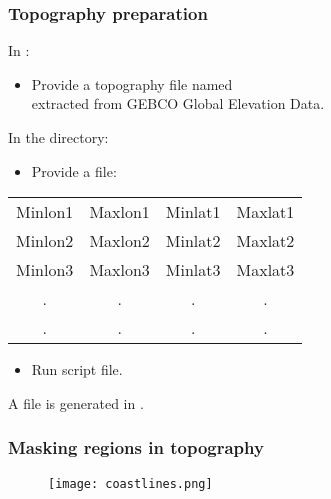 \begin{frame}
\frametitle{Topography preparation}

\centerline{In :}
\begin{itemize}
\item \small Provide a topography file named  \\
 extracted from GEBCO Global Elevation Data.
\end{itemize}

\centerline{In the  directory:}

\begin{itemize}
\item \small Provide a  file:
\end{itemize}

\vspace{-0.5cm}
\begin{table}
\tiny
\centering
\begin{tabular}{|cccc|}
\hline
Minlon1 & Maxlon1 & Minlat1 & Maxlat1\\
Minlon2 & Maxlon2 & Minlat2 & Maxlat2\\
Minlon3 & Maxlon3 & Minlat3 & Maxlat3\\
   .    &   .   &   .   &  .   \\
   .    &   .   &   .   &  .   \\
\hline
\end{tabular}
\end{table}

\vspace{-0.5cm}
\begin{itemize}
\item Run  script file.
\end{itemize}
\Large{
\centerline{A  file is generated in .}
}
\end{frame}

\begin{frame}
\frametitle{Masking regions in topography}

\begin{figure}
\centering
\texttt{[image: coastlines.png]}
\end{figure}
\end{frame}


